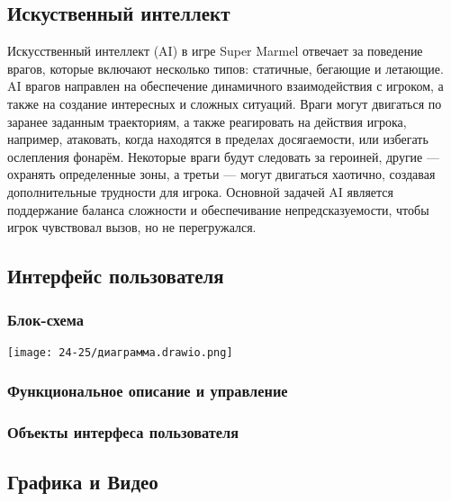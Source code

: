 \documentclass[article,12pt, fleqn]{article}
\begin{document}
\begin{itemize}
\subsection{Искуственный интеллект}
Искусственный интеллект (AI) в игре Super Marmel отвечает за поведение врагов, которые включают несколько типов: статичные, бегающие и летающие. AI врагов направлен на обеспечение динамичного взаимодействия с игроком, а также на создание интересных и сложных ситуаций. Враги могут двигаться по заранее заданным траекториям, а также реагировать на действия игрока, например, атаковать, когда находятся в пределах досягаемости, или избегать ослепления фонарём. Некоторые враги будут следовать за героиней, другие — охранять определенные зоны, а третьи — могут двигаться хаотично, создавая дополнительные трудности для игрока. Основной задачей AI является поддержание баланса сложности и обеспечивание непредсказуемости, чтобы игрок чувствовал вызов, но не перегружался.

\subsection{Интерфейс пользователя}
\subsubsection{Блок-схема}
\begin{center}
    \texttt{[image: 24-25/диаграмма.drawio.png]}
\end{center}
\subsubsection{Функциональное описание и управление}
\subsubsection{Объекты интерфеса пользователя}
\subsection{Графика и Видео}

\end{itemize}
\end{document}
